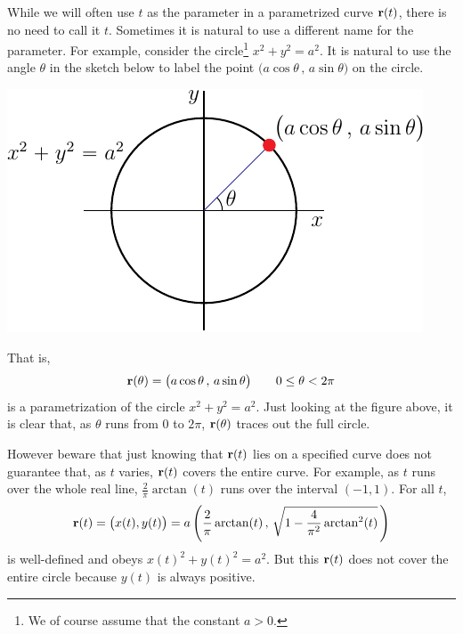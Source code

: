 \begin{eg}[Parametrization of  $x^2+y^2=a^2$]\label{eg:paramCircle}
While we will often use $t$ as the parameter in a parametrized curve $\mathbf{r}(t)$,
there is no need to call it $t$. Sometimes it is natural to use a different 
name for the parameter. For example, consider the circle\footnote{We of course assume that the constant $a>0$.} $x^2+y^2=a^2$.
It is natural to use the angle $\theta$ in the sketch below to label
the point $\big(a\cos\theta\,,\,a\sin\theta\big)$ on the circle. 
\begin{efig}
\begin{center}
     \includegraphics{parCircle.pdf}
\end{center}
\end{efig}
That is,
\begin{equation*}
\mathbf{r}(\theta) = \big(a\cos\theta\,,\,a\sin\theta\big)\qquad
0\le \theta< 2\pi
\end{equation*}
is a parametrization of the circle $x^2+y^2=a^2$. Just looking at the figure above, it is clear that, as $\theta$ runs from $0$ to $2\pi$, $\mathbf{r}(\theta)$
traces out the full circle. 

However beware that just knowing that 
$\mathbf{r}(t)$ lies on a specified curve does not guarantee that, as $t$ varies,
$\mathbf{r}(t)$ covers the entire curve. For example, as $t$ runs over the whole
real line, $\frac{2}{\pi}\arctan(t)$ runs over the interval $(-1,1)$.
For all $t$,
\begin{equation*}
\mathbf{r}(t) = \big(x(t),y(t)\big) 
       = a\left(\frac{2}{\pi}\arctan(t)\,,\,
                \sqrt{1-\frac{4}{\pi^2}\arctan^2(t)}\,\right)
\end{equation*}
is well-defined and obeys $x(t)^2+y(t)^2=a^2$. But this $\mathbf{r}(t)$ does not
cover the entire circle because $y(t)$ is always positive.

\end{eg}

